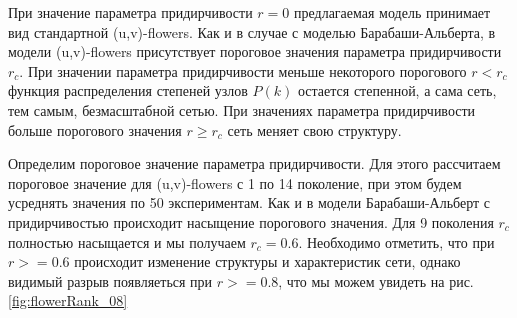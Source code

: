\documentclass[10pt,aps,pra]{revtex4-1}
\begin{document}
При значение параметра придирчивости $r=0$ предлагаемая модель принимает вид стандартной (u,v)-flowers. Как и в случае с моделью Барабаши-Альберта, в модели (u,v)-flowers присутствует пороговое значения параметра придирчивости $r_c$. При значении параметра придирчивости меньше некоторого порогового $r<r_c$ функция распределения степеней узлов $P(k)$ остается степенной, а сама сеть, тем самым, безмасштабной сетью. При значениях параметра придирчивости больше порогового значения $r \geq r_c$ сеть меняет свою структуру. 

Определим пороговое значение параметра придирчивости. Для этого рассчитаем пороговое значение для (u,v)-flowers с 1 по 14 поколение, при этом будем усреднять значения по 50 экспериментам. Как и в модели Барабаши-Альберт с придирчивостью происходит насыщение порогового значения. Для 9 поколения $r_c$ полностью насыщается и мы получаем $r_c=0.6$. Необходимо отметить, что при $r>=0.6$ происходит изменение структуры и характеристик сети, однако видимый разрыв появляеться при $r>=0.8$, что мы можем увидеть на рис. \ref{fig:flowerRank_08}
\end{document}
